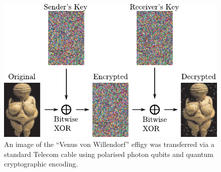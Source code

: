 \begin{figure}[ht]
	\centering
	\includegraphics[width=0.7\columnwidth]{effigy.pdf}
	\caption{An image of the ``Venus von Willendorf'' effigy was transferred via a standard Telecom cable using polarised photon qubits and quantum cryptographic encoding.\label{fig:quantumimage}}
\end{figure}
